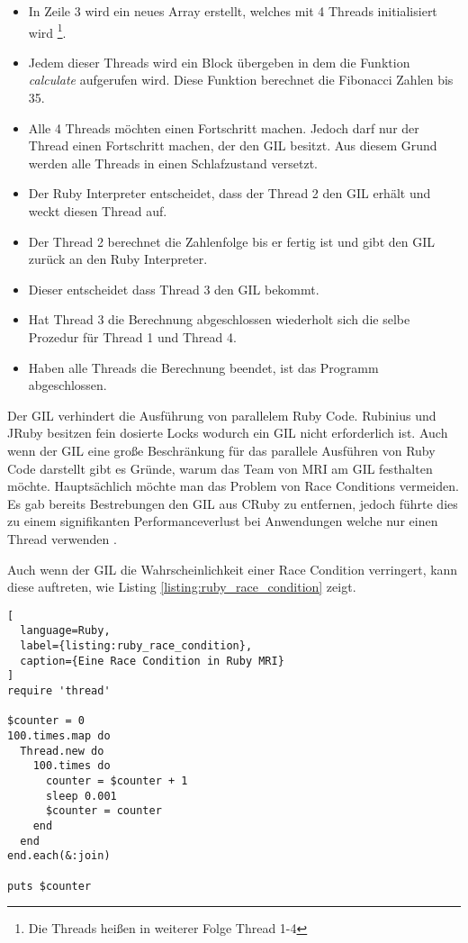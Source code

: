 \begin{itemize}
  \item In Zeile 3 wird ein neues Array erstellt, welches mit 4 Threads initialisiert wird \footnote{Die Threads heißen in weiterer Folge Thread 1-4}.
  \item Jedem dieser Threads wird ein Block übergeben in dem die Funktion \emph{calculate} aufgerufen wird. Diese Funktion berechnet die Fibonacci Zahlen bis 35.
  \item Alle 4 Threads möchten einen Fortschritt machen. Jedoch darf nur der Thread einen Fortschritt machen, der den GIL besitzt. Aus diesem Grund werden alle Threads in einen Schlafzustand versetzt.
  \item Der Ruby Interpreter entscheidet, dass der Thread 2 den GIL erhält und weckt diesen Thread auf.
  \item Der Thread 2 berechnet die Zahlenfolge bis er fertig ist und gibt den GIL zurück an den Ruby Interpreter.
  \item Dieser entscheidet dass Thread 3 den GIL bekommt.
  \item Hat Thread 3 die Berechnung abgeschlossen wiederholt sich die selbe Prozedur für Thread 1 und Thread 4.
  \item Haben alle Threads die Berechnung beendet, ist das Programm abgeschlossen.
\end{itemize}

Der GIL verhindert die Ausführung von parallelem Ruby Code. Rubinius und JRuby besitzen fein dosierte Locks wodurch ein GIL nicht erforderlich ist. Auch wenn der GIL eine große Beschränkung für das parallele Ausführen von Ruby Code darstellt gibt es Gründe, warum das Team von MRI am GIL festhalten möchte. Hauptsächlich möchte man das Problem von Race Conditions vermeiden. Es gab bereits Bestrebungen den GIL aus CRuby zu entfernen, jedoch führte dies zu einem signifikanten Performanceverlust bei Anwendungen welche nur einen Thread verwenden \cite[p. 48-49]{Sto2013}.

Auch wenn der GIL die Wahrscheinlichkeit einer Race Condition verringert, kann diese auftreten, wie Listing \ref{listing:ruby_race_condition} zeigt.

\begin{lstlisting}[
  language=Ruby,
  label={listing:ruby_race_condition},
  caption={Eine Race Condition in Ruby MRI}
]
require 'thread'

$counter = 0
100.times.map do
  Thread.new do
    100.times do
      counter = $counter + 1
      sleep 0.001
      $counter = counter
    end
  end
end.each(&:join)

puts $counter
\end{lstlisting}

